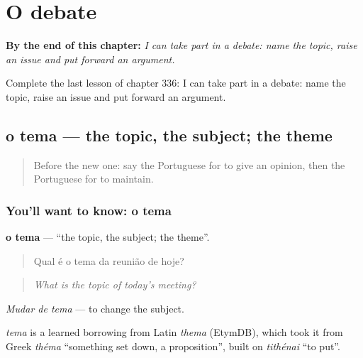 
\chapter{O debate}
\label{ch:pt-o-debate}

\begin{chapteropening}
\textbf{By the end of this chapter:} \emph{I can take part in a debate: name the topic, raise an issue and put forward an argument.}

Complete the last lesson of chapter 336: I can take part in a debate: name the topic, raise an issue and put forward an argument.
\end{chapteropening}

\section[o tema]{o tema — the topic, the subject; the theme}

\label{lesson:PT-C336-tema}



\begin{quote}
Before the new one: say the Portuguese for to give an opinion, then the Portuguese for to maintain.
\end{quote}

\subsection*{You'll want to know: o tema}
\textbf{o tema} — \textquotedblleft{}the topic, the subject; the theme\textquotedblright{}.

\begin{quote}
Qual é o tema da reunião de hoje?
\end{quote}

\begin{quote}
\emph{What is the topic of today's meeting?}
\end{quote}

\emph{Mudar de tema} — to change the subject.

\begin{cousinweb}
\emph{tema} is a learned borrowing from Latin \emph{thema} (EtymDB), which took it from Greek \emph{théma} \textquotedblleft{}something set down, a proposition\textquotedblright{}, built on \emph{tithénai} \textquotedblleft{}to put\textquotedblright{}.
\end{cousinweb}

